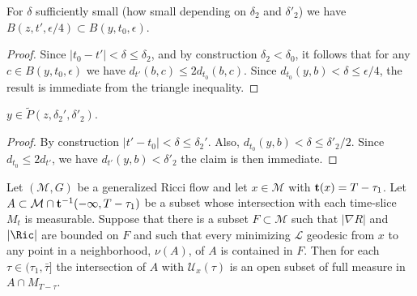 \begin{claim}\label{claim:parabolic-ball-containment}
For $\delta$ sufficiently small (how small depending on $\delta_2$
and $\delta'_2$) we have $B(z,t',\epsilon/4)\subset
B(y,t_0,\epsilon)$.
\end{claim}

\begin{proof}
\sketch
Since $|t_0-t'|<\delta\le \delta_2$, and by construction
$\delta_2<\delta_0$, it follows  that for any $c\in
B(y,t_0,\epsilon)$ we have $d_{t'}(b,c)\le 2d_{t_0}(b,c)$. Since
$d_{t_0}(y,b)<\delta\le \epsilon/4$, the result is immediate from
the triangle inequality.
\end{proof}

\begin{claim}\label{claim:point-in-parabolic-neighborhood}
$y\in \widetilde P(z,\delta_2',\delta'_2)$.
\end{claim}

\begin{proof}
\sketch
By construction $|t'-t_0|<\delta\le \delta_2'$. Also,
$d_{t_0}(y,b)<\delta\le \delta'_2/2$. Since $d_{t_0}\le 2d_{t'}$, we
have $d_{t'}(y,b)< \delta'_2$ the claim is then immediate.
\end{proof}

\begin{corollary}\label{cor:reduced-length-full-measure}
\label{fullmeasure}
Let $({\mathcal M},G)$ be a generalized Ricci flow and let $x\in {\mathcal M}$
with ${\bf t}(x)=T-\tau_1$. Let
 $A\subset {\mathcal
M}\cap {\bf t}^{-1}(-\infty,T-\tau_1)$ be a subset whose intersection with each
time-slice $M_t$ is measurable. Suppose that there is a  subset $F\subset
{\mathcal M}$ such that $|\nabla R|$ and $|\Ric|$ are bounded on $F$ and
such that every minimizing ${\mathcal L}$ geodesic from $x$ to any point in a
neighborhood, $\nu(A)$, of $A$ is contained in $F$. Then for each $\tau\in
(\tau_1,\bar\tau]$ the intersection of $A$ with ${\mathcal U}_x(\tau)$ is an
open subset of full measure in $A\cap M_{T-\tau}$.
\end{corollary}


